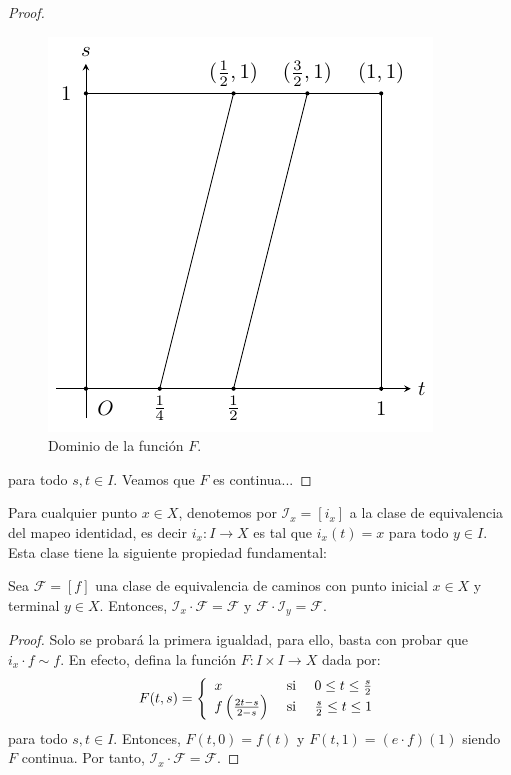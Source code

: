 \documentclass[12pt]{report}
\theoremstyle{largebreak}
\newcommand\cf[3]{\ensuremath{#1:#2\rightarrow#3}}
\begin{document}
\begin{proof}
        \begin{figure}
            \begin{center}
                \includegraphics[scale=1]{images/fig_1.pdf}
            \end{center}
            \caption{Dominio de la función $F$.}
        \end{figure}

        para todo $s,t\in I$. Veamos que $F$ es continua... %
    \end{proof}

    Para cualquier punto $x\in X$, denotemos por $\mathscr{I}_x=[i_x]$ a la clase de equivalencia del mapeo identidad, es decir $\cf{i_x}{I}{X}$ es tal que $i_x(t)=x$ para todo $y\in I$. Esta clase tiene la siguiente propiedad fundamental:

    \begin{lema}
        Sea $\mathscr{F}=[f]$ una clase de equivalencia de caminos con punto inicial $x\in X$ y terminal $y\in X$. Entonces, $\mathscr{I}_x\cdot\mathscr{F}=\mathscr{F}$ y $\mathscr{F}\cdot\mathscr{I}_y=\mathscr{F}$.
    \end{lema}

    \begin{proof}
        Solo se probará la primera igualdad, para ello, basta con probar que $i_x\cdot f\sim f$. En efecto, defina la función $\cf{F}{I\times I}{X}$ dada por:
        \begin{equation*}
            F(t,s)=\left\{
                \begin{array}{lcr}
                    x & \textup{ si } & 0\leq t\leq\frac{s}{2}\\
                    f\left(\frac{2t-s}{2-s}\right) & \textup{ si } & \frac{s}{2}\leq t\leq 1\\
                \end{array}
            \right.
        \end{equation*}
        para todo $s,t\in I$. Entonces, $F(t,0)=f(t)$ y $F(t,1)=(e\cdot f)(1)$ siendo $F$ continua. Por tanto, $\mathscr{I}_x\cdot\mathscr{F}=\mathscr{F}$.
    \end{proof}
\end{document}
